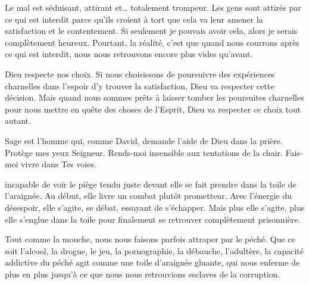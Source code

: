 Le mal est séduisant, attirant et\dots{} totalement trompeur.
 Les gens sont attirés par ce qui est interdit parce qu'ils croient
 à tort que cela va leur amener la satisfaction et le contentement.
 \og Si seulement je pouvais avoir cela,
 alors je serais complètement heureux. \fg{}
 Pourtant, la réalité, c'est que quand nous courrons après ce qui est interdit,
 nous nous retrouvons encore plus vides qu'avant.


Dieu respecte nos choix. Si nous choisissons de poursuivre des expériences
 charnelles dans l'espoir d'y trouver la satisfaction,
 Dieu va respecter cette décision.
 Mais quand nous sommes prêts à laisser tomber les poursuites charnelles
 pour nous mettre en quête des choses de l'Esprit,
 Dieu va respecter ce choix tout autant.

Sage est l'homme qui, comme David, demande l'aide de Dieu dans la prière.
 \og Protège mes yeux Seigneur.
 Rends-moi insensible aux tentations de la chair.
 Fais-moi vivre dans Tes voies. \fg{}

\dvrule







 \ocadr incapable de voir le piège tendu juste devant elle \fcadr{}
 se fait prendre dans la toile de l'araignée.
 Au début, elle livre un combat plutôt prometteur.
 Avec l'énergie du désespoir, elle s'agite, se débat,
 essayant de s'échapper.
 Mais plus elle s'agite, plus elle s'englue dans la toile
 pour finalement se retrouver complètement prisonnière. 

Tout comme la mouche, nous nous faisons parfois attraper
 par le péché.
 Que ce soit l'alcool, la drogue, le jeu, la pornographie,
 la débauche, l'adultère, la capacité addictive du péché
 agit comme une toile d'araignée gluante, qui nous enferme
 de plus en plus jusqu'à ce que nous nous retrouvions
 esclaves de la corruption. 

